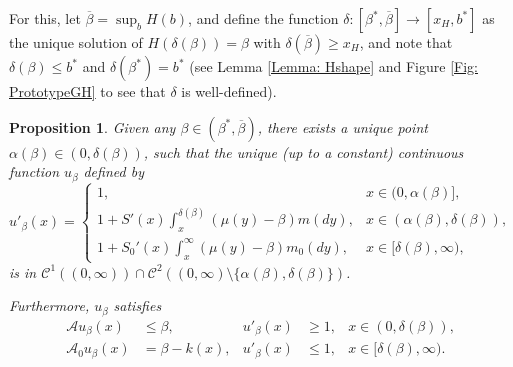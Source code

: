 \documentclass[12pt]{article}
\newtheorem{proposition}[theorem]{Proposition}
\begin{document}
For this, let $\overline\beta=\sup_bH(b)$, and
define the function $\delta: [\beta^*, \overline{\beta}] \to [x_H, b^*]$ as the unique solution of 
$H(\delta(\beta)) = \beta$ with $\delta(\overline{\beta}) \geq  x_H$, and note that $\delta(\beta)\leq b^*$ and 
$\delta(\beta^*) = b^*$ (see Lemma \ref{Lemma: Hshape} and Figure \ref{Fig: PrototypeGH} to see that $\delta$ is well-defined).

\begin{proposition}\label{Prop:Approx:Solution}
    Given any $\beta \in (\beta^*, \overline{\beta})$, there exists a unique point $\alpha(\beta) \in (0, \delta(\beta))$, such that the unique (up to a constant) continuous function $u_\beta$ defined by
    \begin{equation*}
        u'_{\beta}(x) = 
        \begin{cases}
            1, & x \in (0, \alpha(\beta)], \\
            1+S'(x)\int^{\delta(\beta)}_{x} (\mu(y) - \beta)m(dy), & x \in (\alpha(\beta), \delta(\beta)), \\
            1+S_0'(x) \int_x^{\infty} (\mu(y)-\beta) m_0(dy), & x \in [\delta(\beta), \infty),
        \end{cases}
    \end{equation*}
    is in $\mathcal{C}^1((0,\infty))\cap \mathcal{C}^2((0,\infty)\setminus\{\alpha(\beta),\delta(\beta)\})$.

    Furthermore, $u_{\beta}$ satisfies
  \begin{align} \label{Eq: u'betalower}
       \mathcal A u_\beta(x)&\leq \beta,  &  u'_{\beta}(x) &\geq 1,   & x \in (0, \delta(\beta)), \\
       \mathcal A_0u_\beta(x) &=\beta-k(x), &  u'_{\beta}(x) &\leq 1,  & x \in [\delta(\beta), \infty).  
      \label{Eq: u'betaupper}
    \end{align}
\end{proposition}
\end{document}
